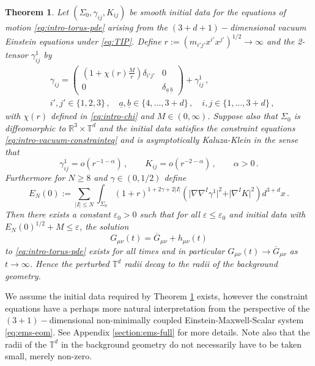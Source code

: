 \documentclass[11pt, a4paper]{amsart}
\numberwithin{equation}{section}
\newtheorem{theorem}{Theorem}
\numberwithin{theorem}{section}
\newcommand{\R}{\mathbb{R}}
\newcommand{\mn}{{\mu \nu}}
\newcommand{\tee}{{\mathbb{T}^d}}
\newcommand{\abar}{{\underline{a}}}
\newcommand{\bbar}{{\underline{b}}}
\newcommand{\abbar}{{\underline{a} \, \underline{b}}}
\newcommand{\gzero}{\overline{G}}
\newcommand{\I}{\vert I \vert}
\begin{document}
\begin{theorem} \label{intro:corol-motiv}
Let $(\Sigma_0, \gamma_{ij}, K_{ij})$ be smooth initial data for the equations of motion \eqref{eq:intro-torus-pde} arising from the $(3+d+1)-$dimensional vacuum Einstein equations under \eqref{eq:TIP}.  Define $r := ( m_{i'j'} x^{i'} x^{j'} )^{1/2} \to \infty$ and the 2-tensor $\gamma^1_{ij}$ by
\begin{align*}
&\gamma_{ij} = \begin{pmatrix}
\left( 1+ \chi(r) \frac{M}{r} \right) \delta_{i'j'} & 0 \\
0 & \delta_\abbar
\end{pmatrix} + \gamma^1_{ij} \,, \\
&i', j' \in \{1, 2, 3 \} \,, \quad \abar , \bbar \in \{ 4, \ldots, 3+d\} \,, \quad i, j \in \{1, \ldots, 3+d\} \,,
\end{align*} 
with $\chi(r)$ defined in \eqref{eq:intro-chi} and $M \in (0, \infty)$. 
Suppose also that $\Sigma_0$ is diffeomorphic to $\R^3 \times \tee$ and the initial data satisfies the constraint equations \eqref{eq:intro-vacuum-constrainteq} and is asymptotically Kaluza-Klein in the sense that
\begin{equation}
\gamma^1_{ij} = o(r^{-1-\alpha}) \,,  \qquad K_{ij}= o(r^{-2-\alpha}) \,, \qquad  \alpha >0 \,.
\end{equation}
Furthermore for $N \geq 8$ and $\gamma \in (0, 1/2)$ define
$$ E_N(0) := \sum_{\vert I \vert \leq N} \int_{\Sigma_0}  (1+r)^{1+2\gamma+2\I} \left( \vert \nabla \nabla^I \gamma^1 \vert^2  +\vert \nabla^I K \vert^2  \right) d^{3+d} x  \,.$$
Then there exists a constant $\varepsilon_0>0$ such that for all $\varepsilon \leq \varepsilon_0$ and initial data with $E_N(0)^{1/2} + M \leq \varepsilon$, the solution 
$$G_\mn (t) = \gzero_\mn + h_\mn(t) $$
to \eqref{eq:intro-torus-pde} exists for all times and 
in particular $G_\mn (t) \to \gzero_\mn$ as $t \to \infty$. Hence the perturbed $\tee$ radii decay to the radii of the background geometry.  
\end{theorem} 

We assume the initial data required by Theorem \ref{intro:corol-motiv} exists, however the constraint equations have a perhaps more natural interpretation from the perspective of the $(3+1)-$dimensional non-minimally coupled Einstein-Maxwell-Scalar system \eqref{eq:ems-eom}. See Appendix \ref{section:ems-full} for more details. Note also that the radii of the $\tee$ in the background geometry do not necessarily have to be taken small, merely non-zero. 
\end{document}
